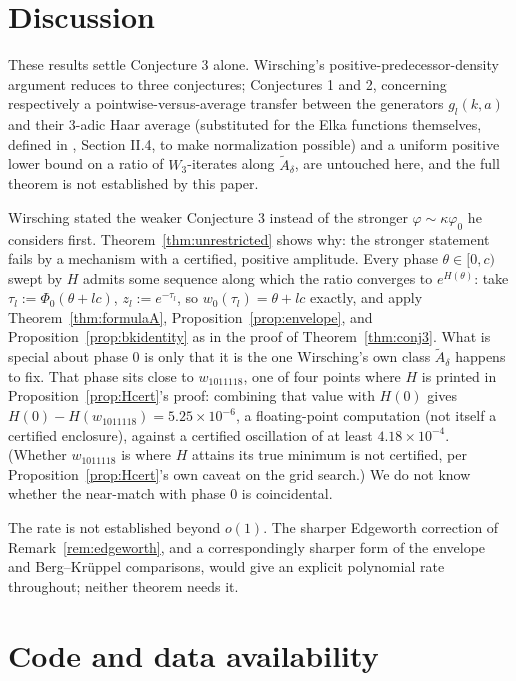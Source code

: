 \documentclass[11pt]{amsart}
\theoremstyle{plain}
\theoremstyle{definition}
\theoremstyle{remark}
\begin{document}
\section{Discussion}
\label{sec:discussion}

These results settle Conjecture 3 alone. Wirsching's positive-predecessor-density argument reduces
to three conjectures; Conjectures 1 and 2, concerning respectively a pointwise-versus-average
transfer between the generators $g_l(k,a)$ and their 3-adic Haar average (substituted for the Elka
functions themselves, defined in \cite{wirsching1998}, Section II.4, to make normalization
possible) and a uniform positive lower bound on a ratio
of $W_3$-iterates along $\widetilde A_\delta$, are untouched here, and the full theorem is not
established by this paper.

Wirsching stated the weaker Conjecture 3 instead of the stronger $\varphi\sim\kappa\varphi_0$ he
considers first. Theorem~\ref{thm:unrestricted} shows why: the stronger statement fails by a
mechanism with a certified, positive amplitude. Every
phase $\theta\in[0,c)$ swept by $H$ admits some sequence along which the ratio converges to
$e^{H(\theta)}$: take $\tau_l := \Phi_0(\theta+lc)$, $z_l := e^{-\tau_l}$, so $w_0(\tau_l)=\theta+lc$
exactly, and apply Theorem~\ref{thm:formulaA}, Proposition~\ref{prop:envelope}, and
Proposition~\ref{prop:bkidentity} as in the proof of Theorem~\ref{thm:conj3}. What is
special about phase $0$ is only that it is the one Wirsching's own class $\widetilde A_\delta$
happens to fix. That phase sits close to $w_{1011118}$, one of four points where $H$ is printed in
Proposition~\ref{prop:Hcert}'s proof: combining that value with $H(0)$ gives
$H(0) - H(w_{1011118}) = 5.25\times10^{-6}$, a floating-point computation (not itself a certified
enclosure), against a
certified oscillation of at least $4.18\times10^{-4}$. (Whether $w_{1011118}$ is where $H$ attains
its true minimum is not certified, per Proposition~\ref{prop:Hcert}'s own caveat on the grid
search.) We do not know whether the near-match with phase $0$ is coincidental.

The rate is not established beyond $o(1)$. The sharper Edgeworth correction of
Remark~\ref{rem:edgeworth}, and a correspondingly sharper form of the envelope and Berg--Kr\"uppel
comparisons, would give an explicit polynomial rate throughout; neither theorem needs it.

\section{Code and data availability}
\label{sec:code}
\end{document}

